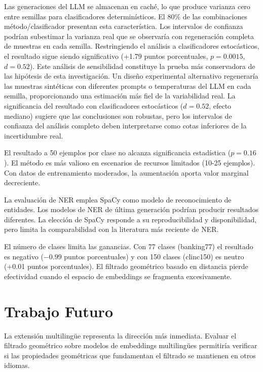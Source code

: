 Las generaciones del LLM se almacenan en caché, lo que produce varianza cero entre semillas para clasificadores determinísticos. El 80\% de las combinaciones método/clasificador presentan esta característica. Los intervalos de confianza podrían subestimar la varianza real que se observaría con regeneración completa de muestras en cada semilla. Restringiendo el análisis a clasificadores estocásticos, el resultado sigue siendo significativo (+1.79 puntos porcentuales, $p = 0.0015$, $d = 0.52$). Este análisis de sensibilidad constituye la prueba más conservadora de las hipótesis de esta investigación. Un diseño experimental alternativo regeneraría las muestras sintéticas con diferentes prompts o temperaturas del LLM en cada semilla, proporcionando una estimación más fiel de la variabilidad real. La significancia del resultado con clasificadores estocásticos ($d = 0.52$, efecto mediano) sugiere que las conclusiones son robustas, pero los intervalos de confianza del análisis completo deben interpretarse como cotas inferiores de la incertidumbre real.

El resultado a 50 ejemplos por clase no alcanza significancia estadística ($p = 0.16$). El método es más valioso en escenarios de recursos limitados (10-25 ejemplos). Con datos de entrenamiento moderados, la aumentación aporta valor marginal decreciente.

La evaluación de NER emplea SpaCy como modelo de reconocimiento de entidades. Los modelos de NER de última generación podrían producir resultados diferentes. La elección de SpaCy responde a su reproducibilidad y disponibilidad, pero limita la comparabilidad con la literatura más reciente de NER.

El número de clases limita las ganancias. Con 77 clases (banking77) el resultado es negativo ($-0.99$ puntos porcentuales) y con 150 clases (clinc150) es neutro (+0.01 puntos porcentuales). El filtrado geométrico basado en distancia pierde efectividad cuando el espacio de embeddings se fragmenta excesivamente.

\section{Trabajo Futuro}
\label{sec:trabajo_futuro}

La extensión multilingüe representa la dirección más inmediata. Evaluar el filtrado geométrico sobre modelos de embeddings multilingües permitiría verificar si las propiedades geométricas que fundamentan el filtrado se mantienen en otros idiomas.

